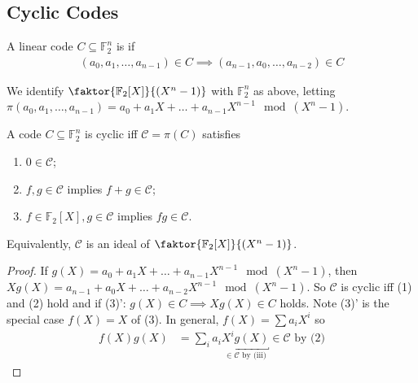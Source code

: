 
\subsection{Cyclic Codes}

\begin{definition}
    A linear code $C \subseteq \mathbb F_2^n$ is  if
    \begin{align*}
        (a_0, a_1, \dots, a_{n-1}) \in C \implies (a_{n-1}, a_0, \dots, a_{n-2}) \in C
    \end{align*}
\end{definition}

We identify $\faktor{\mathbb F_2[X]}{(X^n - 1)}$ with $\mathbb F_2^n$ as above, letting $\pi(a_0, a_1, \dots, a_{n-1}) = a_0 + a_1X + \dots + a_{n-1}X^{n-1} \mod (X^n - 1)$.

\begin{lemma}
    A code $C \subseteq \mathbb F_2^n$ is cyclic iff $\mathcal C = \pi(C)$ satisfies
    \begin{enumerate}
        \item $0 \in \mathcal C$;
        \item $f, g \in \mathcal C$ implies $f + g \in \mathcal C$;
        \item $f \in \mathbb F_2[X], g \in \mathcal C$ implies $fg \in \mathcal C$.
    \end{enumerate}
\end{lemma}

Equivalently, $\mathcal C$ is an ideal of $\faktor{\mathbb F_2[X]}{(X^n - 1)}$.

\begin{proof}
    If $g(X) = a_0 + a_1X + \dots + a_{n-1}X^{n-1} \mod (X^n - 1)$, then $Xg(X) = a_{n-1} + a_0X + \dots + a_{n-2}X^{n-1} \mod (X^n - 1)$.
    So $\mathcal C$ is cyclic iff (1) and (2) hold and if (3)': $g(X) \in C \implies Xg(X) \in C$ holds.
    Note (3)' is the special case $f(X) = X$ of (3).
    In general, $f(X) = \sum a_i X^i$ so
    \begin{align*}
        f(X) g(X) &= \sum_i a_i \underbracket{X^i g(X)}_{\in \mathcal{C} \text{ by (iii)}} \in \mathcal{C} \text{ by (2)}
    \end{align*}
\end{proof}

